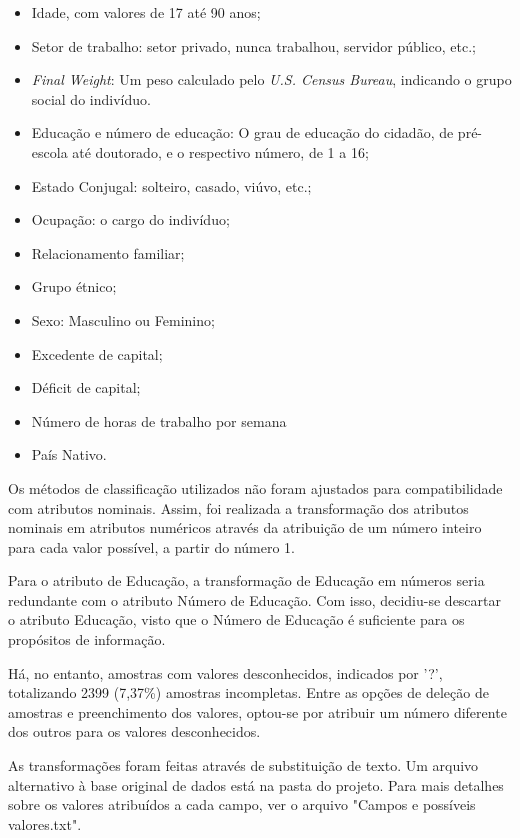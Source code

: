 \documentclass[10pt, conference, compsocconf]{IEEEtran}
\begin{document}
\begin{itemize}
	\item Idade, com valores de 17 até 90 anos;
    \item Setor de trabalho: setor privado, nunca trabalhou, servidor público, etc.;
    \item \textit{Final Weight}: Um peso calculado pelo \textit{U.S. Census Bureau}, indicando o grupo social do indivíduo.
    \item Educação e número de educação: O grau de educação do cidadão, de pré-escola até doutorado, e o respectivo número, de 1 a 16;
    \item Estado Conjugal: solteiro, casado, viúvo, etc.;
    \item Ocupação: o cargo do indivíduo;
    \item Relacionamento familiar;
    \item Grupo étnico;
    \item Sexo: Masculino ou Feminino;
    \item Excedente de capital;
    \item Déficit de capital;
    \item Número de horas de trabalho por semana
    \item País Nativo.
\end{itemize}

Os métodos de classificação utilizados não foram ajustados para compatibilidade com atributos nominais. Assim, foi realizada a transformação dos atributos nominais em atributos numéricos através da atribuição de um número inteiro para cada valor possível, a partir do número 1. 

Para o atributo de Educação, a transformação de Educação em números seria redundante com o atributo Número de Educação. Com isso, decidiu-se descartar o atributo Educação, visto que o Número de Educação é suficiente para os propósitos de informação.

Há, no entanto, amostras com valores desconhecidos, indicados por '?', totalizando 2399 (7,37\%) amostras incompletas. Entre as opções de deleção de amostras e preenchimento dos valores, optou-se por atribuir um número diferente dos outros para os valores desconhecidos.

As transformações foram feitas através de substituição de texto. Um arquivo alternativo à base original de dados está na pasta do projeto. Para mais detalhes sobre os valores atribuídos a cada campo, ver o arquivo "Campos e possíveis valores.txt".
\end{document}
